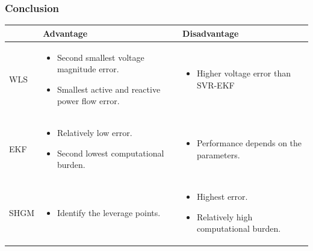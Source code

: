 \subsubsection{Conclusion}
    \begin{table}[!h]
        \centering
        \begin{tabular}{m{1cm}|m{7cm}|m{7cm}|}
            & \textbf{Advantage} & \textbf{Disadvantage} \\ \hline
            WLS &   \begin{itemize}
                        \item Second smallest voltage magnitude error.
                        \item Smallest active and reactive power flow error.
                    \end{itemize}
                      &   
                    \begin{itemize}
                        \item Higher voltage error than SVR-EKF
                    \end{itemize}
                      \\ \cline{1-3}
            EKF &   \begin{itemize}
                        \item Relatively low error.
                        \item Second lowest computational burden.
                    \end{itemize}
                      &   
                    \begin{itemize}
                        \item Performance depends on the parameters.
                    \end{itemize}
                      \\ \cline{1-3}
            SHGM &   \begin{itemize}
                        \item Identify the leverage points.
                    \end{itemize}
                      &   
                    \begin{itemize}
                        \item Highest error.
                        \item Relatively high computational burden.
                    \end{itemize}
                      \\ \cline{1-3} 

\end{tabular}
\end{table}
